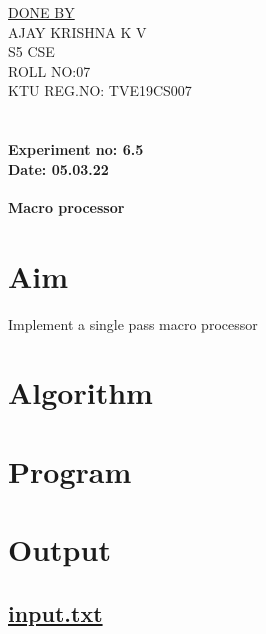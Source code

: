 \documentclass{article}
\begin{document}
\date{}

\addvspace{100mm}

\begin{center}
\Huge{\underline{DONE BY}}
\huge{
\vspace{5mm}
\\AJAY KRISHNA K V
\vspace{5mm}
\\S5 CSE
\vspace{5mm}
\\ROLL NO:07
\vspace{5mm}
\\KTU REG.NO: TVE19CS007
}
\end{center}

\newpage
\paragraph{
\\Experiment no: 6.5
\\Date: 05.03.22
}

\begin{center}
\Huge{\textbf{Macro processor}}
\end{center}

\section*{Aim}
Implement a single pass macro processor

\section*{Algorithm}

\section*{Program}



\section*{Output}
\subsection*{\underline{input.txt}}
\end{document}
